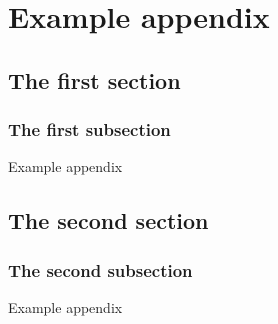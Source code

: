 \chapter{Example appendix}
\label{chap:appendix}
\chaptoc{}

\newpage
\section{The first section}
\subsection{The first subsection}

Example appendix

\newpage
\section{The second section}
\subsection{The second subsection}

Example appendix
